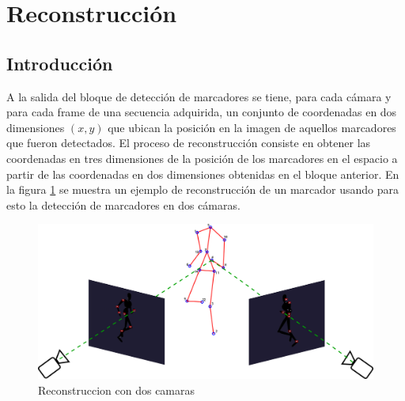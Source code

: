 


\section{Reconstrucción}
\subsection{Introducción}
A la salida del bloque de detección de marcadores se tiene, para cada cámara y para cada frame de una secuencia adquirida, un conjunto de coordenadas en dos dimensiones $(x,y)$ que ubican la posición en la imagen de aquellos marcadores que fueron detectados.
El proceso de reconstrucción consiste en obtener las coordenadas en tres dimensiones de la posición de los marcadores en el espacio a partir de las coordenadas en dos dimensiones obtenidas en el bloque anterior.
En la figura \ref{fig: esquema_reconstruccion} se muestra un ejemplo de reconstrucción de un marcador usando para esto la detección de marcadores en dos cámaras.\\

\begin{figure}[H]
\begin{center}
\includegraphics[scale=0.20]{img/Reconstruccion/ejemplo_reconstruccion.png}

\end{center}
\caption{Reconstruccion con dos camaras}
\label{fig: esquema_reconstruccion}
\end{figure}


